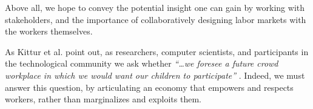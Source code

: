 Above all, we hope to convey the potential insight one can gain by working with stakeholders,
and the importance of collaboratively designing labor markets with the workers themselves.

As Kittur et al. point out, as researchers, computer scientists, and participants in the technological community we ask whether
\textit{``\dots we foresee a future crowd workplace in which we would want our children to participate''} \cite{crowdworkFuture}.
Indeed, we must answer this question, by articulating an economy that empowers and respects workers, rather than marginalizes and exploits them.